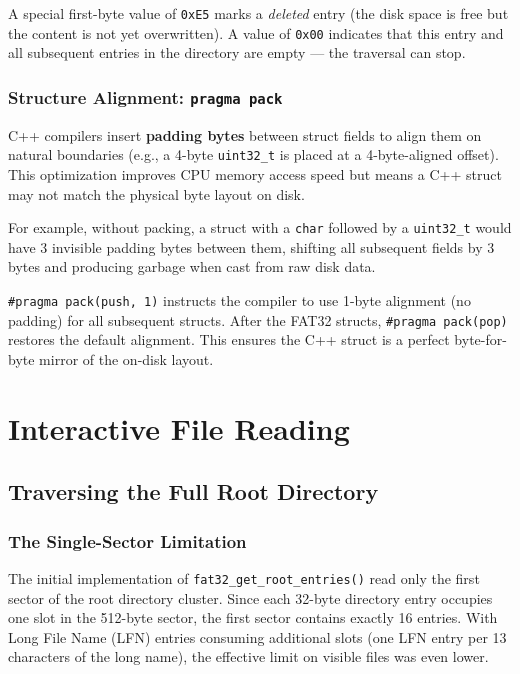 \documentclass[12pt,a4paper]{report}
\begin{document}
A special first-byte value of \texttt{0xE5} marks a \textit{deleted} entry
(the disk space is free but the content is not yet overwritten). A value of
\texttt{0x00} indicates that this entry and all subsequent entries in the directory
are empty --- the traversal can stop.

\subsection{Structure Alignment: \texttt{pragma pack}}

C++ compilers insert \textbf{padding bytes} between struct fields to align them on
natural boundaries (e.g., a 4-byte \texttt{uint32\_t} is placed at a 4-byte-aligned
offset). This optimization improves CPU memory access speed but means a C++ struct
may not match the physical byte layout on disk.

For example, without packing, a struct with a \texttt{char} followed by a
\texttt{uint32\_t} would have 3 invisible padding bytes between them, shifting all
subsequent fields by 3 bytes and producing garbage when cast from raw disk data.

\texttt{\#pragma pack(push, 1)} instructs the compiler to use 1-byte alignment
(no padding) for all subsequent structs. After the FAT32 structs, \texttt{\#pragma pack(pop)}
restores the default alignment. This ensures the C++ struct is a perfect byte-for-byte
mirror of the on-disk layout.

\newpage

\chapter{Interactive File Reading}

\section{Traversing the Full Root Directory}

\subsection{The Single-Sector Limitation}

The initial implementation of \texttt{fat32\_get\_root\_entries()} read only the first
sector of the root directory cluster. Since each 32-byte directory entry occupies one
slot in the 512-byte sector, the first sector contains exactly 16 entries. With Long
File Name (LFN) entries consuming additional slots (one LFN entry per 13 characters
of the long name), the effective limit on visible files was even lower.
\end{document}
